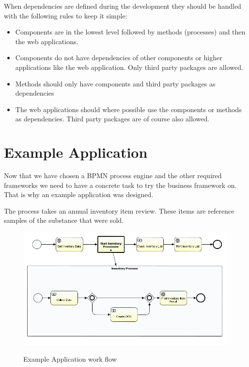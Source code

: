 \documentclass[paper=a4,twoside=false,BCOR=0mm,DIV=calc,fontsize=12pt]{scrartcl}
\begin{document}
When dependencies are defined during the development they should be handled with the following rules to keep it simple:
\begin{itemize}
 \item Components are in the lowest level followed by methods (processes) and then the web applications.
 \item Components do not have dependencies of other components or higher applications like the web application. Only third party packages are allowed.
 \item Methods should only have components and third party packages as dependencies
 \item The web applications should where possible use the components or methods as dependencies. Third party packages are of course also allowed.
\end{itemize}

\section{Example Application}
Now that we have chosen a BPMN process engine and the other required frameworks we need to have a concrete task to try the business framework on. That is why an example application was designed.

The process takes an annual inventory item review. These items are reference samples of the substance that were sold.

\begin{figure}
    \begin{center}
      \includegraphics[width=1\textwidth]{./img/PanExampleBPMN.png}\\
    \end{center}
  \caption{Example Application work flow}
  \label{panexampleWorkflow}
\end{figure} 
\end{document}
